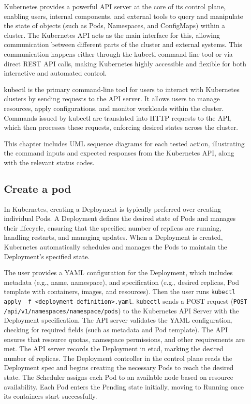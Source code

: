 \documentclass[main.tex]{subfiles}
\begin{document}
Kubernetes provides a powerful API server at the core of its control plane, enabling users, internal components, and external tools to query and manipulate the state of objects (such as Pods, Namespaces, and ConfigMaps) within a cluster. The Kubernetes API acts as the main interface for this, allowing communication between different parts of the cluster and external systems. This communication happens either through the kubectl command-line tool or via direct REST API calls, making Kubernetes highly accessible and flexible for both interactive and automated control.

kubectl is the primary command-line tool for users to interact with Kubernetes clusters by sending requests to the API server. It allows users to manage resources, apply configurations, and monitor workloads within the cluster. Commands issued by kubectl are translated into HTTP requests to the API, which then processes these requests, enforcing desired states across the cluster.

This chapter includes UML sequence diagrams for each tested action, illustrating the command inputs and expected responses from the Kubernetes API, along with the relevant status codes.

\subsection{Create a pod}
In Kubernetes, creating a Deployment is typically preferred over creating individual Pods. A Deployment defines the desired state of Pods and manages their lifecycle, ensuring that the specified number of replicas are running, handling restarts, and managing updates. When a Deployment is created, Kubernetes automatically schedules and manages the Pods to maintain the Deployment's specified state.

The user provides a YAML configuration for the Deployment, which includes metadata (e.g., name, namespace), and specification (e.g., desired replicas, Pod template with containers, images, and resources). Then the user runs \texttt{kubectl apply -f <deployment-definition>.yaml}.
\texttt{kubectl} sends a POST request (\texttt{POST /api/v1/namespaces/{namespace}/pods}) to the Kubernetes API Server with the Deployment specification. The API server validates the YAML configuration, checking for required fields (such as metadata and Pod template).
The API ensures that resource quotas, namespace permissions, and other requirements are met. The API server records the Deployment in etcd, marking the desired number of replicas.
The Deployment controller in the control plane reads the Deployment spec and begins creating the necessary Pods to reach the desired state. The Scheduler assigns each Pod to an available node based on resource availability.
Each Pod enters the Pending state initially, moving to Running once its containers start successfully.
\end{document}
